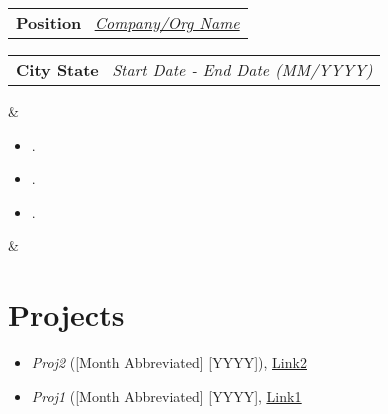 \documentclass[10pt,a4paper,garamond]{moderncv}
\makeatletter
\newcommand*{\customcventry}[7][.13em]{
\begin{tabular}{@{}l}
{\bfseries #4} \
{\itshape #3}
\end{tabular}
\hfill
\begin{tabular}{l@{}}
{\bfseries #5} \
{\itshape #2}
\end{tabular}
\ifx&#7&%
\else{\
\begin{minipage}{\maincolumnwidth}%
\small#7%
\end{minipage}}\fi%
\par\addvspace{#1}}
\makeatother
\begin{document}
\customcventry{Start Date ‐ End Date (MM/YYYY)}{{\color{black}\href{https://www.google.com/}{Company/Org Name}}}{Position}{City State}{}{
{\begin{itemize}[leftmargin=0.7cm, label={\textbullet}]
\item .
\item .
\item .
\end{itemize}}}

\section{Projects}
{\begin{itemize}[label=\textbullet]
      \item \textit{Proj2} ([Month Abbreviated] [YYYY]), \underline{\color{black}\href{https://www.google.com}{Link2}}
      \item \textit{Proj1} ([Month Abbreviated] [YYYY], \underline{\color{black}\href{https://www.google.com}{Link1}} 
  \end{itemize}}


\end{document}
